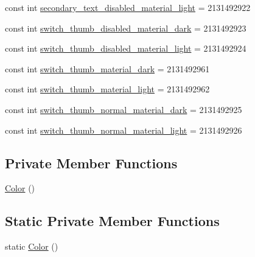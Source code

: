 \begin{DoxyCompactItemize}
\item 
const int \mbox{\hyperlink{class_f_w_p_s___app_1_1_droid_1_1_resource_1_1_color_aa1e49a89bc60364e88f8e57552571da9}{secondary\+\_\+text\+\_\+disabled\+\_\+material\+\_\+light}} = 2131492922
\item 
const int \mbox{\hyperlink{class_f_w_p_s___app_1_1_droid_1_1_resource_1_1_color_a321f27644e536b3128dd4ce9034052ca}{switch\+\_\+thumb\+\_\+disabled\+\_\+material\+\_\+dark}} = 2131492923
\item 
const int \mbox{\hyperlink{class_f_w_p_s___app_1_1_droid_1_1_resource_1_1_color_ac24d6e30444c27910731de6907b2975c}{switch\+\_\+thumb\+\_\+disabled\+\_\+material\+\_\+light}} = 2131492924
\item 
const int \mbox{\hyperlink{class_f_w_p_s___app_1_1_droid_1_1_resource_1_1_color_af1b56348b7d6e28c5547b8c8c692ea6a}{switch\+\_\+thumb\+\_\+material\+\_\+dark}} = 2131492961
\item 
const int \mbox{\hyperlink{class_f_w_p_s___app_1_1_droid_1_1_resource_1_1_color_a2a5ac3588c92d6e5054042a96a9be8dc}{switch\+\_\+thumb\+\_\+material\+\_\+light}} = 2131492962
\item 
const int \mbox{\hyperlink{class_f_w_p_s___app_1_1_droid_1_1_resource_1_1_color_a7d09fb023087df7adb69ed3b40fbd102}{switch\+\_\+thumb\+\_\+normal\+\_\+material\+\_\+dark}} = 2131492925
\item 
const int \mbox{\hyperlink{class_f_w_p_s___app_1_1_droid_1_1_resource_1_1_color_ab19155885e1d5c2d01cc913cfd9a8b2b}{switch\+\_\+thumb\+\_\+normal\+\_\+material\+\_\+light}} = 2131492926
\end{DoxyCompactItemize}
\subsection*{Private Member Functions}
\begin{DoxyCompactItemize}
\item 
\mbox{\hyperlink{class_f_w_p_s___app_1_1_droid_1_1_resource_1_1_color_adaf48a0a21343329c19ec8b4e5003368}{Color}} ()
\end{DoxyCompactItemize}
\subsection*{Static Private Member Functions}
\begin{DoxyCompactItemize}
\item 
static \mbox{\hyperlink{class_f_w_p_s___app_1_1_droid_1_1_resource_1_1_color_a28fc97d9dc4d161c2a1e7ded0119b279}{Color}} ()
\end{DoxyCompactItemize}


